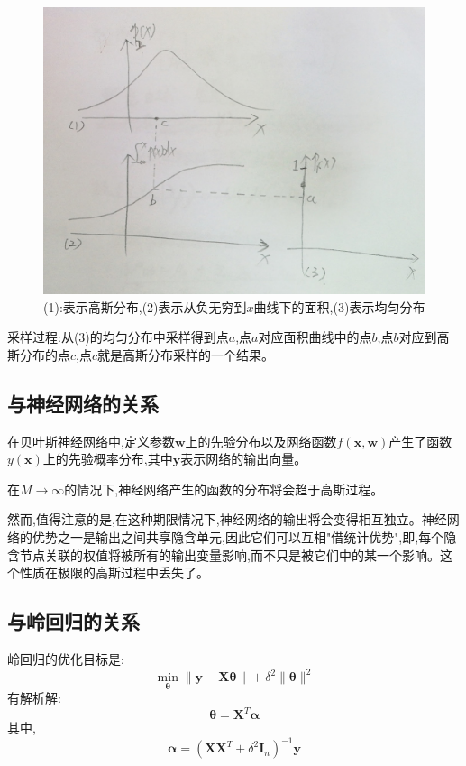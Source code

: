 \documentclass[UTF8,a4paper]{ctexart}
\begin{document}
        \begin{figure}[H]\centering
            \includegraphics[scale = 0.2]{assets/GaussianProcess_16efa.png}
            \caption{(1):表示高斯分布,(2)表示从负无穷到$x$曲线下的面积,(3)表示均匀分布}
        \end{figure}
        采样过程:从(3)的均匀分布中采样得到点$a$,点$a$对应面积曲线中的点$b$,点$b$对应到高斯分布的点$c$,点$c$就是高斯分布采样的一个结果。

        \subsection{与神经网络的关系}
        在贝叶斯神经网络中,定义参数$\bm w$上的先验分布以及网络函数$f(\bm x,\bm w)$产生了函数$y(\bm x)$上的先验概率分布,其中$\bm y$表示网络的输出向量。

        在$M\to \infty $的情况下,神经网络产生的函数的分布将会趋于高斯过程。

        然而,值得注意的是,在这种期限情况下,神经网络的输出将会变得相互独立。神经网络的优势之一是输出之间共享隐含单元,因此它们可以互相"借统计优势",即,每个隐含节点关联的权值将被所有的输出变量影响,而不只是被它们中的某一个影响。这个性质在极限的高斯过程中丢失了。

        \subsection{与岭回归的关系}
        岭回归的优化目标是:
        \begin{equation}
            \min_{\bm \theta} \|\bm y - \bm X\bm \theta\| + \delta^2\|\bm \theta\|^2
        \end{equation}
        有解析解:
        \begin{equation}
            \bm \theta = \bm X^T \bm \alpha
        \end{equation}
        其中,
        \begin{equation}
            \bm \alpha = (\bm X\bm X^T + \delta^2 \bm I_n)^{-1}\bm y
        \end{equation}
\end{document}
